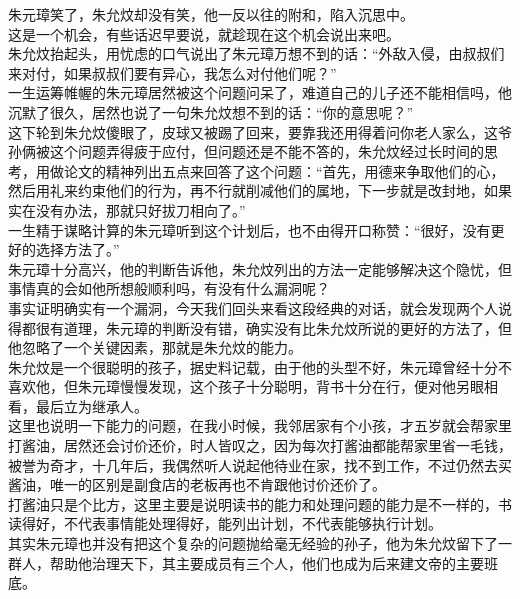 \begin{multicols}{\theparacolNo}
朱元璋笑了，朱允炆却没有笑，他一反以往的附和，陷入沉思中。\\

这是一个机会，有些话迟早要说，就趁现在这个机会说出来吧。\\

朱允炆抬起头，用忧虑的口气说出了朱元璋万想不到的话：“外敌入侵，由叔叔们来对付，如果叔叔们要有异心，我怎么对付他们呢？”\\

一生运筹帷幄的朱元璋居然被这个问题问呆了，难道自己的儿子还不能相信吗，他沉默了很久，居然也说了一句朱允炆想不到的话：“你的意思呢？”\\

这下轮到朱允炆傻眼了，皮球又被踢了回来，要靠我还用得着问你老人家么，这爷孙俩被这个问题弄得疲于应付，但问题还是不能不答的，朱允炆经过长时间的思考，用做论文的精神列出五点来回答了这个问题：“首先，用德来争取他们的心，然后用礼来约束他们的行为，再不行就削减他们的属地，下一步就是改封地，如果实在没有办法，那就只好拔刀相向了。”\\

一生精于谋略计算的朱元璋听到这个计划后，也不由得开口称赞：“很好，没有更好的选择方法了。”\\

朱元璋十分高兴，他的判断告诉他，朱允炆列出的方法一定能够解决这个隐忧，但事情真的会如他所想般顺利吗，有没有什么漏洞呢？\\

事实证明确实有一个漏洞，今天我们回头来看这段经典的对话，就会发现两个人说得都很有道理，朱元璋的判断没有错，确实没有比朱允炆所说的更好的方法了，但他忽略了一个关键因素，那就是朱允炆的能力。\\

朱允炆是一个很聪明的孩子，据史料记载，由于他的头型不好，朱元璋曾经十分不喜欢他，但朱元璋慢慢发现，这个孩子十分聪明，背书十分在行，便对他另眼相看，最后立为继承人。\\

这里也说明一下能力的问题，在我小时候，我邻居家有个小孩，才五岁就会帮家里打酱油，居然还会讨价还价，时人皆叹之，因为每次打酱油都能帮家里省一毛钱，被誉为奇才，十几年后，我偶然听人说起他待业在家，找不到工作，不过仍然去买酱油，唯一的区别是副食店的老板再也不肯跟他讨价还价了。\\

打酱油只是个比方，这里主要是说明读书的能力和处理问题的能力是不一样的，书读得好，不代表事情能处理得好，能列出计划，不代表能够执行计划。\\

其实朱元璋也并没有把这个复杂的问题抛给毫无经验的孙子，他为朱允炆留下了一群人，帮助他治理天下，其主要成员有三个人，他们也成为后来建文帝的主要班底。\\


\end{multicols}
